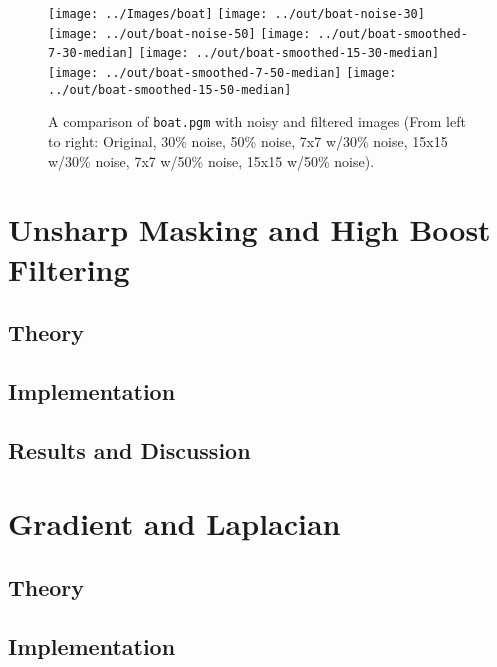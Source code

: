 \documentclass[headings=optiontoheadandtoc,listof=totoc,parskip=full]{scrartcl}
\begin{document}
\begin{figure}[ht]
	\centering
	\texttt{[image: ../Images/boat]}
	\texttt{[image: ../out/boat-noise-30]}
	\texttt{[image: ../out/boat-noise-50]}
	\texttt{[image: ../out/boat-smoothed-7-30-median]}
	\texttt{[image: ../out/boat-smoothed-15-30-median]}
	\texttt{[image: ../out/boat-smoothed-7-50-median]}
	\texttt{[image: ../out/boat-smoothed-15-50-median]}
	\caption{A comparison of \texttt{boat.pgm} with noisy and filtered images (From left to right: Original, 30\% noise, 50\% noise, 7x7 w/30\% noise, 15x15 w/30\% noise, 7x7 w/50\% noise, 15x15 w/50\% noise).}
	\label{fig:median-result-4}
\end{figure}


\section{Unsharp Masking and High Boost Filtering}
\label{sec:unsharp}


\subsection{Theory}


\subsection{Implementation}


\subsection{Results and Discussion}
\label{sec:unsharp-results}


\section{Gradient and Laplacian}
\label{sec:gradient}

\subsection{Theory}
\label{sec:gradient-theory}


\subsection{Implementation}
\label{sec:gradient-implementation}
\end{document}
